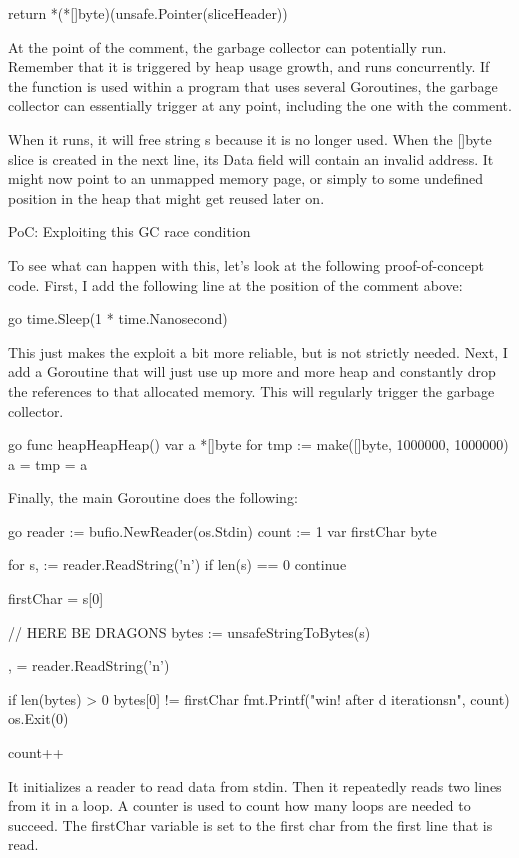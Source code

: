 	return *(*[]byte)(unsafe.Pointer(sliceHeader))



At the point of the comment, the garbage collector can potentially run. Remember that it is triggered by heap usage
growth, and runs concurrently. If the function is used within a program that uses several Goroutines, the garbage
collector can essentially trigger at any point, including the one with the comment.

When it runs, it will free string s because it is no longer used. When the []byte slice is created in the next line,
its Data field will contain an invalid address. It might now point to an unmapped memory page, or simply to some
undefined position in the heap that might get reused later on.


 PoC: Exploiting this GC race condition

To see what can happen with this, let's look at the following proof-of-concept code. First, I add the following line
at the position of the comment above:

go
    time.Sleep(1 * time.Nanosecond)


This just makes the exploit a bit more reliable, but is not strictly needed. Next, I add a Goroutine that will just use
up more and more heap and constantly drop the references to that allocated memory. This will regularly trigger the
garbage collector.

go
func heapHeapHeap() 
	var a *[]byte
	for 
		tmp := make([]byte, 1000000, 1000000)
		a = tmp
         = a
	



Finally, the main Goroutine does the following:

go
reader := bufio.NewReader(os.Stdin)
count := 1
var firstChar byte

for 
    s,  := reader.ReadString('n')
    if len(s) == 0 
        continue
    
    firstChar = s[0]

    // HERE BE DRAGONS
    bytes := unsafeStringToBytes(s)

    ,  = reader.ReadString('n')

    if len(bytes) > 0  bytes[0] != firstChar 
        fmt.Printf("win! after d iterationsn", count)
        os.Exit(0)
    

    count++



It initializes a reader to read data from stdin. Then it repeatedly reads two lines from it in a loop. A counter is
used to count how many loops are needed to succeed. The firstChar variable is set to the first char from the first
line that is read.

